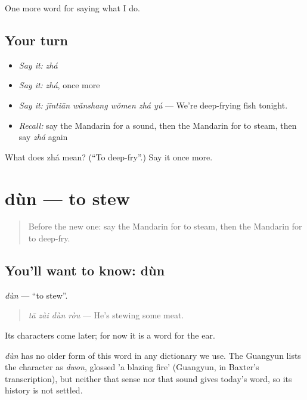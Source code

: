 \begin{grammarlens}[title={What you've built}]
One more word for saying what I do.
\end{grammarlens}

\subsection*{Your turn}
\begin{itemize}
\raggedright
  \item \emph{Say it:} \emph{zhá}
  \item \emph{Say it:} \emph{zhá}, once more
  \item \emph{Say it:} \emph{jīntiān wǎnshang wǒmen zhá yú} — We're deep-frying fish tonight.
  \item \emph{Recall:} say the Mandarin for a sound, then the Mandarin for to steam, then say \emph{zhá} again
\end{itemize}

\begin{tcolorbox}[breakable,colback=teal!4,colframe=teal!35!black,title={Before you move on}]
What does zhá mean? (\textquotedblleft{}To deep-fry\textquotedblright{}.) Say it once more.
\end{tcolorbox}
\section[dùn]{dùn — to stew}

\label{lesson:ZH-C168-dun}



\begin{quote}
Before the new one: say the Mandarin for to steam, then the Mandarin for to deep-fry.
\end{quote}

\subsection*{You'll want to know: dùn}
\emph{dùn} — \textquotedblleft{}to stew\textquotedblright{}.

\begin{quote}
\emph{tā zài dùn ròu} — He's stewing some meat.
\end{quote}

Its characters come later; for now it is a word for the ear.

\begin{cousinweb}
\emph{dùn} has no older form of this word in any dictionary we use. The Guangyun lists the character as \emph{dwon}, glossed 'a blazing fire' (Guangyun, in Baxter's transcription), but neither that sense nor that sound gives today's word, so its history is not settled.
\end{cousinweb}

